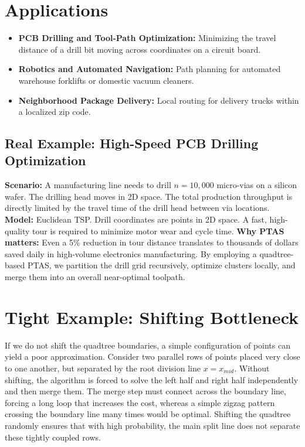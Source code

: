 \section{Applications}
\begin{itemize}
    \item \textbf{PCB Drilling and Tool-Path Optimization:} Minimizing the travel distance of a drill bit moving across coordinates on a circuit board.
    \item \textbf{Robotics and Automated Navigation:} Path planning for automated warehouse forklifts or domestic vacuum cleaners.
    \item \textbf{Neighborhood Package Delivery:} Local routing for delivery trucks within a localized zip code.
\end{itemize}

\subsection*{Real Example: High-Speed PCB Drilling Optimization}
\textbf{Scenario:} A manufacturing line needs to drill $n = 10,000$ micro-vias on a silicon wafer. The drilling head moves in 2D space. The total production throughput is directly limited by the travel time of the drill head between via locations.
\textbf{Model:} Euclidean TSP. Drill coordinates are points in 2D space. A fast, high-quality tour is required to minimize motor wear and cycle time.
\textbf{Why PTAS matters:} Even a 5\% reduction in tour distance translates to thousands of dollars saved daily in high-volume electronics manufacturing. By employing a quadtree-based PTAS, we partition the drill grid recursively, optimize clusters locally, and merge them into an overall near-optimal toolpath.

\section{Tight Example: Shifting Bottleneck}
If we do not shift the quadtree boundaries, a simple configuration of points can yield a poor approximation. Consider two parallel rows of points placed very close to one another, but separated by the root division line $x = x_{mid}$. Without shifting, the algorithm is forced to solve the left half and right half independently and then merge them. The merge step must connect across the boundary line, forcing a long loop that increases the cost, whereas a simple zigzag pattern crossing the boundary line many times would be optimal. Shifting the quadtree randomly ensures that with high probability, the main split line does not separate these tightly coupled rows.

